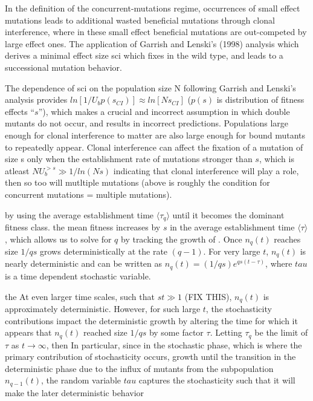 \documentclass[12pt]{article}
\begin{document}
In the definition of the concurrent-mutations regime, occurrences of small effect mutations leads to additional wasted beneficial mutations through clonal interference, where in these small effect beneficial mutations are out-competed by large effect ones.  The application of Garrish and Lenski's (1998) analysis which derives a minimal effect size sci which fixes in the wild type, and leads to a successional mutation behavior.

The dependence of sci on the population size N following Garrish and Lenski's analysis provides $ln[1/U_b p(s_{CI})]\approx ln[Ns_{CI}]$ ($p(s)$ is distribution of fitness effects “$s$”), which makes a crucial and incorrect assumption in which double mutants do not occur, and results in incorrect predictions. Populations large enough for clonal interference to matter are also large enough for bound mutants to repeatedly appear.  Clonal interference can affect the fixation of a mutation of size s only when the establishment rate of  mutations stronger than $s$, which is atleast $NU_b^{>s} \gg 1/ln(Ns)$ indicating that clonal interference will play a role, then so too will mutltiple mutations (above is roughly the condition for concurrent mutations = multiple mutations). 



by using the average establishment time $\langle \tau_q \rangle$ until it becomes the dominant fitness class.   the mean fitness increases by $s$ in the average establishment time $\langle \tau \rangle$, which allows us to solve for $q$ by tracking the growth of .  Once $n_q(t)$ reaches size $1/qs$ grows deterministically at the rate $(q-1)$.  For very large $t$, $n_q(t)$ is nearly deterministic and can be written as $n_q(t)= (1/qs)e^{qs(t-\tau)}$, where $tau$ is a time dependent stochastic variable.   

the At even larger time scales, such that $st\gg 1$ (FIX THIS), $n_q(t)$ is approximately deterministic.  However, for such large $t$, the stochasticity contributions impact the deterministic growth by altering the time for which it appears that $n_q(t)$ reached size $1/qs$ by some factor $\tau$.  Letting $\tau_q$ be the limit of $\tau$ as $t \rightarrow \infty$, then  In particular, since in the stochastic phase, which is where the primary contribution of stochasticity occurs, growth until the transition in the deterministic phase due to the influx of mutants from the subpopulation $n_{q-1}(t)$, the random variable $tau$ captures the stochasticity such that it will make the later deterministic behavior
\end{document}
